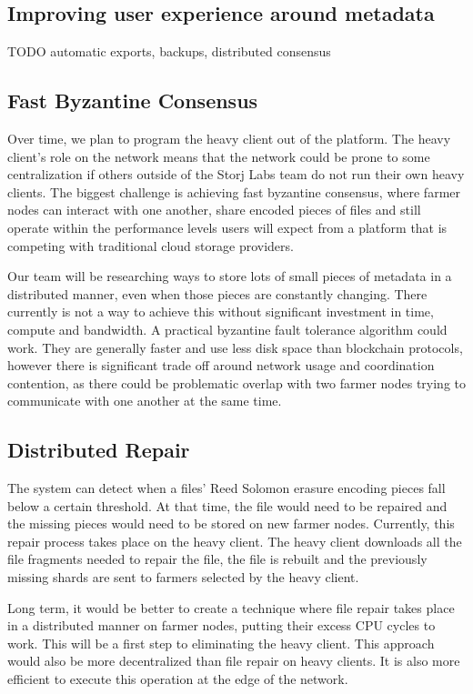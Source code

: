 \documentclass[a4paper,10pt]{article} \usepackage[utf8]{inputenc}
\newcommand{\todo}[1]{{\color{red} TODO #1 }}
\begin{document}
\subsection{Improving user experience around metadata}

\todo{automatic exports, backups, distributed consensus}

\subsection{Fast Byzantine Consensus}

Over time, we plan to program the heavy client out of the platform. The heavy
client's role on the network means that the network could be prone to some
centralization if others outside of the Storj Labs team do not run their own
heavy clients. The biggest challenge is achieving fast byzantine consensus,
where farmer nodes can interact with one another, share encoded pieces of files
and still operate within the performance levels users will expect from a
platform that is competing with traditional cloud storage providers.

Our team will be researching ways to store lots of small pieces of metadata
in a distributed manner, even when those pieces are constantly changing. There
currently is not a way to achieve this without significant investment in time,
compute and bandwidth. A practical byzantine fault tolerance algorithm could
work. They are generally faster and use less disk space than blockchain
protocols, however there is significant trade off around network usage and
coordination contention, as there could be problematic overlap with two farmer
nodes trying to communicate with one another at the same time.

\subsection{Distributed Repair}

The system can detect when a files' Reed Solomon erasure encoding pieces fall
below a certain threshold. At that time, the file would need to be repaired and
the missing pieces would need to be stored on new farmer nodes. Currently, this
repair process takes place on the heavy client. The heavy client downloads all
the file fragments needed to repair the file, the file is rebuilt and the
previously missing shards are sent to farmers selected by the heavy client.

Long term, it would be better to create a technique where file repair takes
place in a distributed manner on farmer nodes, putting their excess CPU cycles
to work. This will be a first step to eliminating the heavy client. This
approach would also be more decentralized than file repair on heavy clients. It
is also more efficient to execute this operation at the edge of the network.
\end{document}

